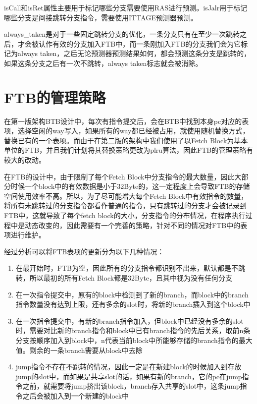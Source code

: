 isCall和isRet属性主要用于标记哪些分支需要使用RAS进行预测。isJalr用于标记哪些分支是间接跳转分支指令，需要使用ITTAGE预测器预测。

always\_taken是对于一些固定跳转分支的优化，一条分支只有在至少一次跳转之后，才会被认作有效的分支加入FTB中，而一条刚加入FTB的分支我们会为它标记为always taken，之后无论预测器预测结果如何，都会预测这条分支是跳转的，如果这条分支之后有一次不跳转，always taken标志就会被消除。

\section{FTB的管理策略}

在第一版架构BTB设计中，每次有指令提交后，会在BTB中找到本身pc对应的表项，选择空闲的way写入，如果所有的way都已经被占用，就使用随机替换方式，替换已有的一个表项。而由于在第二版的架构中我们使用了以Fetch Block为基本单位的FTB，并且我们计划将其替换策略更改为plru算法，因此FTB的管理策略有较大的改动。

在FTB的设计中，由于限制了每个Fetch Block中分支指令的最大数量，因此大部分时候一个block中的有效数据是小于32Byte的，这一定程度上会导致FTB的存储空间使用效率不高。所以，为了尽可能增大每个Fetch Block中有效指令的数量，将所有未跳转过的分支指令都看作普通的指令，只有跳转过的分支才会被记录到FTB中，这就导致了每个fetch block的大小，分支指令的分布情况，在程序执行过程中是动态改变的，因此需要有一个完善的策略，针对不同的情况对FTB中的表项进行维护。

经过分析可以将FTB表项的更新分为以下几种情况：

\begin{enumerate}
	\item 在最开始时，FTB为空，因此所有的分支指令都识别不出来，默认都是不跳转，所以最初的所有Fetch Block都是32Byte，且其中视为没有任何分支
	\item 在一次指令提交中，原有的block中检测到了新的branch，而block中的branch指令数量没有达到上限，还有多余的slot时，将新的branch插入到这个block中
	\item 在一次指令提交中，有新的branch指令加入，但block中已经没有多余的slot时，需要对比新的branch指令和block中已有branch指令的先后关系，取前n条分支按顺序加入到block中，n代表当前block中所能够存储的branch指令的最大值。剩余的一条branch需要从block中去除
	\item jump指令不存在不跳转的情况，因此一定是在新建block的时候加入到存放jump的slot中，而如果是共享slot的话，如果有新的branch，它的pc在jump指令之前，就需要将jump挤出该block，branch存入共享的slot中，这条jump指令之后会被加入到一个新建的block中
\end{enumerate}

